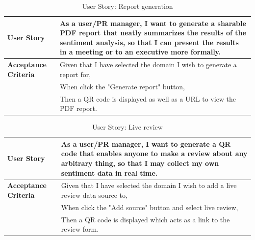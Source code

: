 \documentclass[12pt]{article}
\begin{document}
\begin{table}[htbp]
  \caption{User Story: Report generation}
  \begin{tabular}{|p{}|p{}|}
    \hline
    \textbf{User Story}          & As a user/PR manager, I want to generate a sharable PDF report that neatly summarizes the results of the sentiment analysis, so that I can present the results in a meeting or to an executive more formally. \\
    \hline
    \textbf{Acceptance Criteria} &
    Given that I have selected the domain I wish to generate a report for,                                                                                                                                            \\
                                 & When click the "Generate report" button,                                                                                                                                               \\
                                 & Then a QR code is displayed as well as a URL to view the PDF report.                                                                                   \\
    \hline
  \end{tabular}
\end{table}


\begin{table}[htbp]
  \caption{User Story: Live review}
  \begin{tabular}{|p{}|p{}|}
    \hline
    \textbf{User Story}          & As a user/PR manager, I want to generate a QR code that enables anyone to make a review about any arbitrary thing, so that I may collect my own sentiment data in real time. \\
    \hline
    \textbf{Acceptance Criteria} &
    Given that I have selected the domain I wish to add a live review data source to,                                                                                                                                            \\
                                 & When click the "Add source" button and select live review,                                                                                                                                               \\
                                 & Then a QR code is displayed which acts as a link to the review form.                                                                                   \\
    \hline
  \end{tabular}
\end{table}
\end{document}
